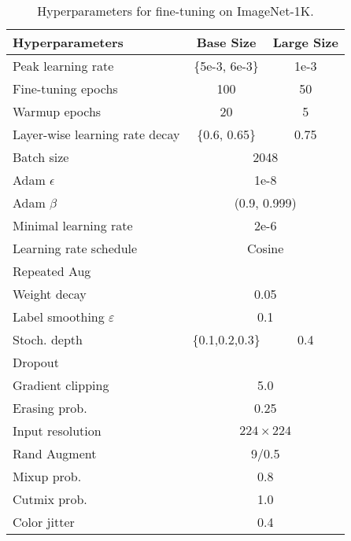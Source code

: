 \documentclass{article}
\newcommand{\xmark}{\ding{55}}
\begin{document}
\begin{table}[H]
    \centering
    \caption{
    Hyperparameters for fine-tuning on ImageNet-1K.
    }
    \begin{tabular}{l|cc}
    \toprule
    \bf Hyperparameters & \bf Base Size & \bf Large Size \\
    \toprule
    Peak learning rate & {\{5e-3, 6e-3\}} & 1e-3 \\ 
    Fine-tuning epochs & 100 & 50 \\
    Warmup epochs  & 20 & 5 \\
    Layer-wise learning rate decay & {\{0.6, 0.65\}} & 0.75 \\
    Batch size & \multicolumn{2}{c}{2048} \\
    Adam $\epsilon$ & \multicolumn{2}{c}{1e-8}  \\
    Adam $\beta$ & \multicolumn{2}{c}{(0.9, 0.999)} \\
    Minimal learning rate & \multicolumn{2}{c}{2e-6} \\
    Learning rate schedule & \multicolumn{2}{c}{Cosine} \\
    \midrule
    Repeated Aug & \multicolumn{2}{c}{\xmark} \\
    Weight decay & \multicolumn{2}{c}{0.05} \\
    Label smoothing $\varepsilon$ & \multicolumn{2}{c}{0.1}     \\
    Stoch. depth & \{0.1,0.2,0.3\} & 0.4 \\
    Dropout & \multicolumn{2}{c}{\xmark} \\
    Gradient clipping & \multicolumn{2}{c}{5.0} \\
    \midrule
    Erasing prob.  & \multicolumn{2}{c}{0.25} \\
    Input resolution & \multicolumn{2}{c}{$224 \times 224$} \\
    Rand Augment  & \multicolumn{2}{c}{9/0.5} \\
    Mixup prob.  & \multicolumn{2}{c}{0.8}     \\
    Cutmix prob.   & \multicolumn{2}{c}{1.0}    \\
    Color jitter & \multicolumn{2}{c}{0.4} \\
    \bottomrule
    \end{tabular}
    \label{tab:appd-hyper-finetune}
\end{table}
\end{document}
